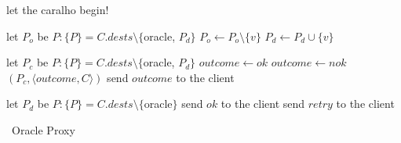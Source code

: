 \begin{algorithm}[h!]
\small

\begin{distribalgo}[1]

\vspace{1.0mm}


    \vspace{1.0mm}
    

    \vspace{1.0mm}

            \STATE let the caralho begin!

        \vspace{1.0mm}

            \STATE let $P_o$ be $P : \{P\} = C.dests \setminus \{$oracle, $P_d\}$
                \STATE $P_o \leftarrow P_o \setminus \{v\}$
                \STATE $P_d \leftarrow P_d \cup      \{v\}$
            \ENDIF

        \vspace{1.0mm}
    
            \STATE let $P_c$ be $P : \{P\} = C.dests \setminus \{$oracle, $P_d\}$
                \STATE $outcome \leftarrow ok$
            \ELSE
                \STATE $outcome \leftarrow nok$
            \ENDIF
            \STATE \rmcast$(P_c, \langle outcome, C \rangle )$
            \STATE send $outcome$ to the client
        
        \vspace{1.0mm}
        
            \STATE let $P_d$ be $P : \{P\} = C.dests \setminus \{$oracle$\}$
                \STATE send $ok$    to the client
            \ELSE
                \STATE send $retry$ to the client
            \ENDIF
            
            
        \ENDIF
    \ENDINDENT
\ENDINDENT

\caption{\dssmr\ Oracle Proxy}
\label{alg:oracle_proxy}
\end{distribalgo}
\end{algorithm}